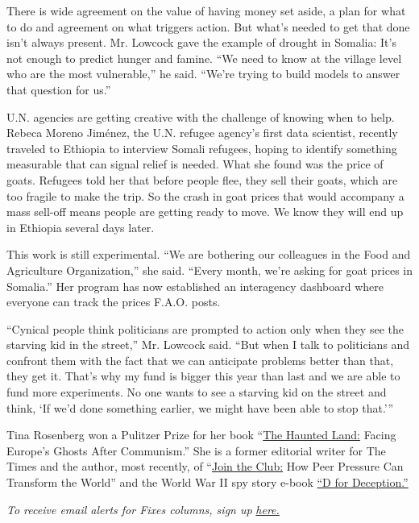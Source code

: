 There is wide agreement on the value of having money set aside, a plan
for what to do and agreement on what triggers action. But what's needed
to get that done isn't always present. Mr. Lowcock gave the example of
drought in Somalia: It's not enough to predict hunger and famine. ``We
need to know at the village level who are the most vulnerable,'' he
said. ``We're trying to build models to answer that question for us.''

U.N. agencies are getting creative with the challenge of knowing when to
help. Rebeca Moreno Jiménez, the U.N. refugee agency's first data
scientist, recently traveled to Ethiopia to interview Somali refugees,
hoping to identify something measurable that can signal relief is
needed. What she found was the price of goats. Refugees told her that
before people flee, they sell their goats, which are too fragile to make
the trip. So the crash in goat prices that would accompany a mass
sell-off means people are getting ready to move. We know they will end
up in Ethiopia several days later.

This work is still experimental. ``We are bothering our colleagues in
the Food and Agriculture Organization,'' she said. ``Every month, we're
asking for goat prices in Somalia.'' Her program has now established an
interagency dashboard where everyone can track the prices F.A.O. posts.

``Cynical people think politicians are prompted to action only when they
see the starving kid in the street,'' Mr. Lowcock said. ``But when I
talk to politicians and confront them with the fact that we can
anticipate problems better than that, they get it. That's why my fund is
bigger this year than last and we are able to fund more experiments. No
one wants to see a starving kid on the street and think, `If we'd done
something earlier, we might have been able to stop that.'''

Tina Rosenberg won a Pulitzer Prize for her book
``\href{http://www.randomhouse.com/catalog/display.pperl?isbn=9780679744993}{The
Haunted Land:} Facing Europe's Ghosts After Communism.'' She is a former
editorial writer for The Times and the author, most recently, of
``\href{http://books.wwnorton.com/books/Join-the-Club}{Join the Club:}
How Peer Pressure Can Transform the World'' and the World War II spy
story e-book
\href{https://www.goodreads.com/book/show/16124470-d-for-deception}{``D
for Deception.''}

\emph{To receive email alerts for Fixes columns, sign up}
\href{http://eepurl.com/ABIxL}{\emph{here.}}

